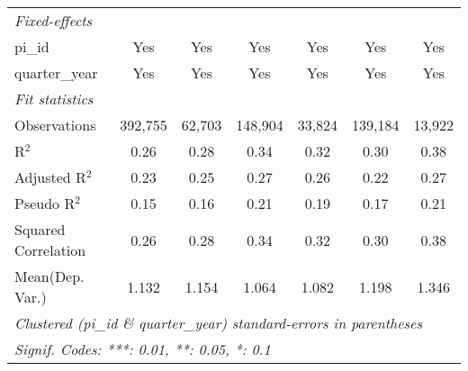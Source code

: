\begin{tabular}{lcccccc}
   \emph{Fixed-effects}\\
   pi\_id                                                     & Yes            & Yes           & Yes            & Yes            & Yes           & Yes\\  
   quarter\_year                                              & Yes            & Yes           & Yes            & Yes            & Yes           & Yes\\  
   \midrule
   \emph{Fit statistics}\\
   Observations                                               & 392,755        & 62,703        & 148,904        & 33,824         & 139,184       & 13,922\\  
   R$^2$                                                      & 0.26           & 0.28          & 0.34           & 0.32           & 0.30          & 0.38\\  
   Adjusted R$^2$                                             & 0.23           & 0.25          & 0.27           & 0.26           & 0.22          & 0.27\\  
   Pseudo R$^2$                                               & 0.15           & 0.16          & 0.21           & 0.19           & 0.17          & 0.21\\  
   Squared Correlation                                        & 0.26           & 0.28          & 0.34           & 0.32           & 0.30          & 0.38\\  
Mean(Dep. Var.) & 1.132 & 1.154 & 1.064 & 1.082 & 1.198 & 1.346 \\
   \midrule \midrule
   \multicolumn{7}{l}{\emph{Clustered (pi\_id \& quarter\_year) standard-errors in parentheses}}\\
   \multicolumn{7}{l}{\emph{Signif. Codes: ***: 0.01, **: 0.05, *: 0.1}}\\
\end{tabular}
\par\endgroup
